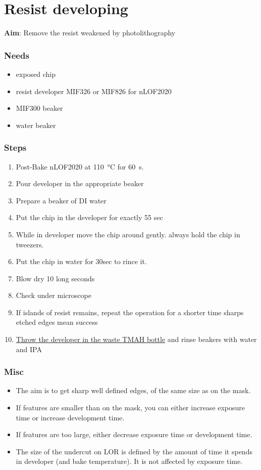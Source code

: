 \section{Resist developing}

\textbf{Aim}:
Remove the resist weakened by photolithography

\subsubsection{Needs}
\begin{itemize}[noitemsep]
\item exposed chip
\item resist developer MIF326 or MIF826 for nLOF2020
\item MIF300 beaker
\item water beaker
\end{itemize}

\subsubsection{Steps}
\begin{enumerate}
\item Post-Bake nLOF2020 at \SI{110}{\celsius} for \SI{60}{\second}.
\item Pour developer in the appropriate beaker
\item Prepare a beaker of DI water
\item Put the chip in the developer for exactly 55 sec
\item While in developer move the chip around gently. always hold the chip in tweezers.
\item Put the chip in water for 30sec to rince it.
\item Blow dry 10 long seconds
\item Check under microscope
\item If islands of resist remains, repeat the operation for a shorter time
sharps etched edges mean success
\item \underline{Throw the developer in the waste TMAH bottle} and rinse beakers with water and IPA
\end{enumerate}

\subsubsection{Misc}
\begin{itemize}
  \item The aim is to get sharp well defined edges, of the same size as on the mask.
  \item If features are smaller than on the mask, you can either increase exposure time or increase development time.
  \item If features are too large, either decrease exposure time or development time.
  \item The size of the undercut on LOR is defined by the amount of time it spends in developer (and bake temperature).
  It is not affected by exposure time.
\end{itemize}
\newpage

